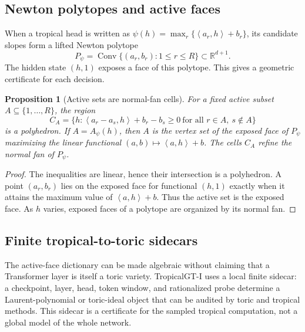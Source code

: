 \documentclass[11pt]{article}
\newtheorem{proposition}[definition]{Proposition}
\newcommand{\R}{\mathbb{R}}
\newcommand{\Conv}{\operatorname{Conv}}
\newcommand{\ip}[2]{\left\langle #1,#2\right\rangle}
\begin{document}
\subsection{Newton polytopes and active faces}

When a tropical head is written as \(\psi(h)=\max_r\{\ip{a_r}{h}+b_r\}\), its candidate slopes form a lifted Newton polytope
\begin{equation}
P_\psi=\Conv\{(a_r,b_r):1\le r\le R\}\subset \R^{d+1}.
\end{equation}
The hidden state \((h,1)\) exposes a face of this polytope.  This gives a geometric certificate for each decision.

\begin{proposition}[Active sets are normal-fan cells]
For a fixed active subset \(A\subseteq \{1,\ldots,R\}\), the region
\begin{equation}
C_A=\{h:\ip{a_r-a_s}{h}+b_r-b_s\ge 0\ \text{for all } r\in A,\ s\notin A\}
\end{equation}
is a polyhedron.  If \(A=A_\psi(h)\), then \(A\) is the vertex set of the exposed face of \(P_\psi\) maximizing the linear functional \((a,b)\mapsto \ip{a}{h}+b\).  The cells \(C_A\) refine the normal fan of \(P_\psi\).
\end{proposition}
\begin{proof}
The inequalities are linear, hence their intersection is a polyhedron.  A point \((a_r,b_r)\) lies on the exposed face for functional \((h,1)\) exactly when it attains the maximum value of \(\ip{a}{h}+b\).  Thus the active set is the exposed face.  As \(h\) varies, exposed faces of a polytope are organized by its normal fan.
\end{proof}


\subsection{Finite tropical-to-toric sidecars}
\label{subsec:finite-tropical-toric-sidecars}

The active-face dictionary can be made algebraic without claiming that a Transformer layer is itself a toric variety.  TropicalGT-I uses a local finite sidecar: a checkpoint, layer, head, token window, and rationalized probe determine a Laurent-polynomial or toric-ideal object that can be audited by toric and tropical methods.  This sidecar is a certificate for the sampled tropical computation, not a global model of the whole network.
\end{document}
